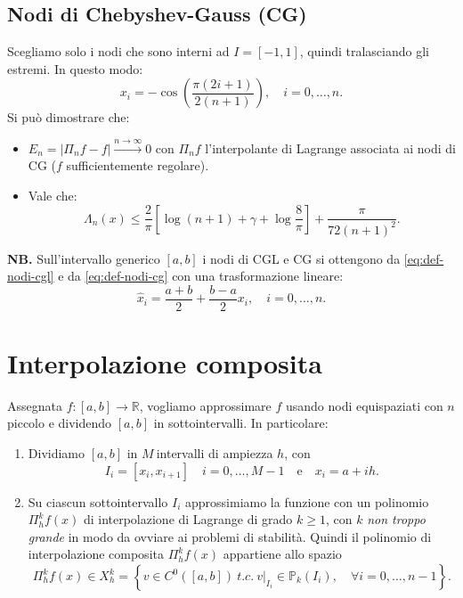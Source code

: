\subsection{Nodi di Chebyshev-Gauss (CG)}
Scegliamo solo i nodi che sono interni ad $I=[ -1,1]$, quindi tralasciando gli estremi. In questo modo:
\begin{equation}
x_{i} =-\cos\left(\frac{\pi ( 2i+1)}{2( n+1)}\right) ,\quad i=0,\dotsc ,n.
\label{eq:def-nodi-cg}
\end{equation}
Si può dimostrare che:
\begin{itemize}
\item $E_{n} =| \Pi _{n} f-f| \xrightarrow{n\rightarrow \infty } 0$ con $\Pi _{n} f$ l'interpolante di Lagrange associata ai nodi di CG ($f$ sufficientemente regolare).
\item Vale che:
$$\Lambda _{n}(x) \leqslant \frac{2}{\pi }\left[\log( n+1) +\gamma +\log\frac{8}{\pi }\right] +\frac{\pi }{72( n+1)^{2}}.$$
\end{itemize}
\textbf{NB.}
Sull'intervallo generico $[ a,b]$ i nodi di CGL e CG si ottengono da \eqref{eq:def-nodi-cgl} e da \eqref{eq:def-nodi-cg} con una trasformazione lineare:
\begin{equation*}
\hat{x}_{i} =\frac{a+b}{2} +\frac{b-a}{2} x_{i}, \quad i=0,\dotsc ,n.
\end{equation*}

\section{Interpolazione composita}
Assegnata $f:[ a,b]\rightarrow \mathbb{R}$, vogliamo approssimare $f$ usando nodi equispaziati con $n$ piccolo e dividendo $[ a,b]$ in sottointervalli.
In particolare:
\begin{enumerate}
\item Dividiamo $[ a,b]$ in $M\ $intervalli di ampiezza $h$, con
$$I_{i} =[ x_{i} ,x_{i+1}] \quad i=0,\dotsc ,M-1 \quad \text{e} \quad x_{i} =a+ih.$$
\item Su ciascun sottointervallo $I_{i}$ approssimiamo la funzione con un polinomio $\Pi ^{k}_{h} f(x)$ di interpolazione di Lagrange di grado $k\geqslant 1$, con $k$ \textit{non troppo grande} in modo da ovviare ai problemi di stabilità. Quindi il polinomio di interpolazione composita $\Pi ^{k}_{h} f(x)$ appartiene allo spazio
\begin{equation*}
\Pi ^{k}_{h} f(x) \in X^{k}_{h} =\left\{v\in C^{0}([ a,b]) \ t.c.\ v|_{I_{i}} \in \mathbb{P}_{k}( I_{i}), \quad \forall i=0,\dotsc ,n-1\right\}.
\end{equation*}
\end{enumerate}

